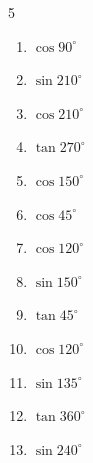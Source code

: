 \begin{multicols}{5}
\begin{enumerate}
  \item $\displaystyle \cos{90^\circ}$

        \phantom{$\displaystyle =0$}

  \item $\displaystyle \sin{210^\circ}$


  \item $\displaystyle \cos{210^\circ}$


  \item $\displaystyle \tan{270^\circ}$

        \phantom{$\displaystyle なし$}

  \item $\displaystyle \cos{150^\circ}$


  \item $\displaystyle \cos{45^\circ}$


  \item $\displaystyle \cos{120^\circ}$


  \item $\displaystyle \sin{150^\circ}$


  \item $\displaystyle \tan{45^\circ}$

        \phantom{$\displaystyle =1$}

  \item $\displaystyle \cos{120^\circ}$


  \item $\displaystyle \sin{135^\circ}$


  \item $\displaystyle \tan{360^\circ}$

        \phantom{$\displaystyle =0$}

  \item $\displaystyle \sin{240^\circ}$


\end{enumerate}
\end{multicols}
